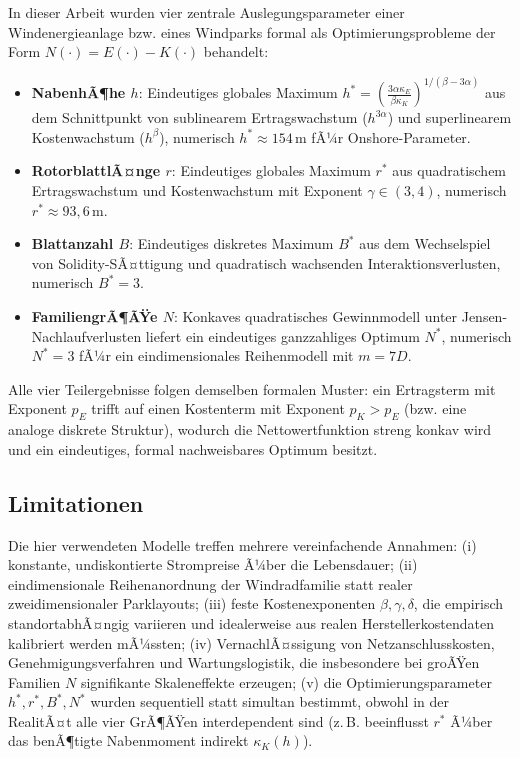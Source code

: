 ﻿\documentclass[a4paper,12pt]{article}
\theoremstyle{definition}
\begin{document}
In dieser Arbeit wurden vier zentrale Auslegungsparameter einer Windenergieanlage bzw. eines Windparks formal als Optimierungsprobleme der Form $N(\cdot)=E(\cdot)-K(\cdot)$ behandelt:

\begin{itemize}
	\item \textbf{NabenhÃ¶he $h$}: Eindeutiges globales Maximum $h^*=\left(\frac{3\alpha\kappa_E}{\beta\kappa_K}\right)^{1/(\beta-3\alpha)}$ aus dem Schnittpunkt von sublinearem Ertragswachstum ($h^{3\alpha}$) und superlinearem Kostenwachstum ($h^\beta$), numerisch $h^*\approx154\,\mathrm{m}$ fÃ¼r Onshore-Parameter.
	\item \textbf{RotorblattlÃ¤nge $r$}: Eindeutiges globales Maximum $r^*$ aus quadratischem Ertragswachstum und Kostenwachstum mit Exponent $\gamma\in(3,4)$, numerisch $r^*\approx93{,}6\,\mathrm{m}$.
	\item \textbf{Blattanzahl $B$}: Eindeutiges diskretes Maximum $B^*$ aus dem Wechselspiel von Solidity-SÃ¤ttigung und quadratisch wachsenden Interaktionsverlusten, numerisch $B^*=3$.
	\item \textbf{FamiliengrÃ¶ÃŸe $N$}: Konkaves quadratisches Gewinnmodell unter Jensen-Nachlaufverlusten liefert ein eindeutiges ganzzahliges Optimum $N^*$, numerisch $N^*=3$ fÃ¼r ein eindimensionales Reihenmodell mit $m=7D$.
\end{itemize}

Alle vier Teilergebnisse folgen demselben formalen Muster: ein Ertragsterm mit Exponent $p_E$ trifft auf einen Kostenterm mit Exponent $p_K > p_E$ (bzw. eine analoge diskrete Struktur), wodurch die Nettowertfunktion streng konkav wird und ein eindeutiges, formal nachweisbares Optimum besitzt.

\subsection{Limitationen}

Die hier verwendeten Modelle treffen mehrere vereinfachende Annahmen: (i) konstante, undiskontierte Strompreise Ã¼ber die Lebensdauer; (ii) eindimensionale Reihenanordnung der Windradfamilie statt realer zweidimensionaler Parklayouts; (iii) feste Kostenexponenten $\beta,\gamma,\delta$, die empirisch standortabhÃ¤ngig variieren und idealerweise aus realen Herstellerkostendaten kalibriert werden mÃ¼ssten; (iv) VernachlÃ¤ssigung von Netzanschlusskosten, Genehmigungsverfahren und Wartungslogistik, die insbesondere bei groÃŸen Familien $N$ signifikante Skaleneffekte erzeugen; (v) die Optimierungsparameter $h^*, r^*, B^*, N^*$ wurden sequentiell statt simultan bestimmt, obwohl in der RealitÃ¤t alle vier GrÃ¶ÃŸen interdependent sind (z.\,B. beeinflusst $r^*$ Ã¼ber das benÃ¶tigte Nabenmoment indirekt $\kappa_K(h)$).
\end{document}
